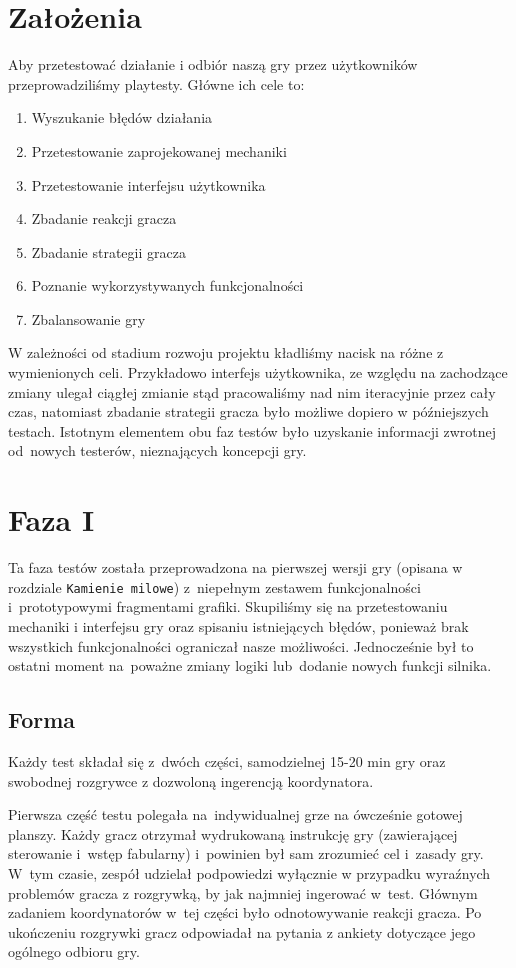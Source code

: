 \documentclass[licencjacka]{pracamgr}
\begin{document}
  \section{Założenia}
  Aby przetestować działanie i odbiór naszą gry przez użytkowników przeprowadziliśmy playtesty. Główne ich cele to:
  \begin{enumerate}
   \item Wyszukanie błędów działania
   \item Przetestowanie zaprojekowanej mechaniki
   \item Przetestowanie interfejsu użytkownika
   \item Zbadanie reakcji gracza
   \item Zbadanie strategii gracza
   \item Poznanie wykorzystywanych funkcjonalności
   \item Zbalansowanie gry
  \end{enumerate}
  W zależności od stadium rozwoju projektu kładliśmy nacisk na różne z wymienionych celi. Przykładowo interfejs użytkownika,
  ze względu na zachodzące zmiany ulegał ciągłej zmianie stąd pracowaliśmy nad nim iteracyjnie przez cały czas, natomiast
  zbadanie strategii gracza było możliwe dopiero w późniejszych testach. Istotnym elementem obu faz testów było uzyskanie
  informacji zwrotnej od~nowych testerów, nieznających koncepcji gry.

    \section{Faza I}
      Ta faza testów została przeprowadzona na pierwszej wersji gry (opisana w rozdziale \texttt{Kamienie milowe})
      z~niepełnym zestawem funkcjonalności i~prototypowymi fragmentami grafiki. Skupiliśmy się na przetestowaniu mechaniki
      i interfejsu gry oraz spisaniu istniejących błędów, ponieważ brak wszystkich funkcjonalności ograniczał nasze możliwości.
      Jednocześnie był to ostatni moment na~poważne zmiany logiki lub~dodanie nowych funkcji silnika.

      \subsection{Forma}
      Każdy test składał  się z~dwóch części, samodzielnej 15-20 min gry
      oraz swobodnej rozgrywce z dozwoloną ingerencją koordynatora.

      Pierwsza część testu polegała na~indywidualnej grze na ówcześnie gotowej planszy.
      Każdy gracz otrzymał wydrukowaną instrukcję gry (zawierającej sterowanie i~wstęp fabularny)
      i~powinien był sam zrozumieć cel i~zasady gry. W~tym czasie, zespół udzielał podpowiedzi
      wyłącznie w przypadku wyraźnych problemów gracza z rozgrywką, by jak najmniej ingerować w~test.
      Głównym zadaniem koordynatorów w~tej części było odnotowywanie reakcji gracza.
      Po ukończeniu rozgrywki gracz odpowiadał na pytania z ankiety dotyczące jego ogólnego odbioru gry.
\end{document}
